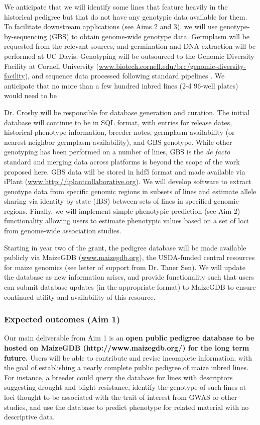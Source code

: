 \documentclass[12pt]{article}
\begin{document}
We anticipate that we will identify some lines that feature heavily in the historical pedigree but that do not have any genotypic data available for them. 
To facilitate downstream applications (see Aims 2 and 3), we will use genotype-by-sequencing (GBS) \citep{Elshire:2011ha} to obtain genome-wide genotype data.
Germplasm will be requested from the relevant sources, and germination and DNA extraction will be performed at UC Davis.  
Genotyping will be outsourced to the Genomic Diversity Facility at Cornell University (\url{www.biotech.cornell.edu/brc/genomic-diversity-facility}), and sequence data processed following standard pipelines \citep{Glaubitz:2014eu}.
We anticipate that no more than a few hundred inbred lines (2-4 96-well plates) would need to be 

Dr. Crosby will be responsible for database generation and curation.
The initial database will continue to be in SQL format, with entries for release dates, historical phenotype information, breeder notes, germplasm availability (or nearest neighbor germplasm availability), and GBS genotype.  
While other genotyping has been performed on a number of lines, GBS is the \emph{de facto} standard \citep{romay2013comprehensive} and merging data across platforms is beyond the scope of the work proposed here. 
GBS data will be stored in hdf5 format and made available via iPlant (\url{www.http://iplantcollaborative.org}).
We will develop software to extract genotype data from specific genomic regions in subsets of lines and estimate allele sharing via identity by state (IBS) between sets of lines in specified genomic regions.
Finally, we will implement simple phenotypic prediction (see Aim 2) functionality allowing users to estimate phenotypic values based on a set of loci from genome-wide association studies.

Starting in year two of the grant, the pedigree database will be made available publicly via MaizeGDB (\url{www.maizegdb.org}), the USDA-funded central resources for maize genomics (see letter of support from Dr. Taner Sen).
We will update the database as new information arises, and provide functionality such that users can submit database updates (in the appropriate format) to MaizeGDB to ensure continued utility and availability of this resource.

\subsubsection*{Expected outcomes (Aim 1)}
Our main deliverable from Aim 1 is an \textbf{open public pedigree database to be hosted on MaizeGDB (http://www.maizegdb.org/) for the long term future.} 
Users will be able to contribute and revise incomplete information, with the goal of establishing a nearly complete public pedigree of maize inbred lines.   
For instance, a breeder could query the database for lines with descriptors suggesting drought and blight resistance, identify the genotype of such lines at loci thought to be associated with the trait of interest from GWAS or other studies, and use the database to predict phenotype for related material with no descriptive data.
\end{document}
